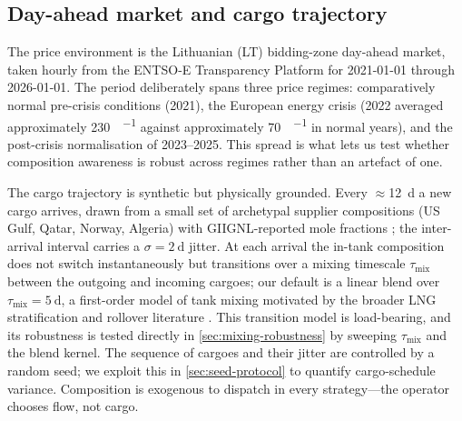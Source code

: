 \documentclass[11pt]{article}
\begin{document}
\subsection{Day-ahead market and cargo trajectory}

The price environment is the Lithuanian (LT) bidding-zone day-ahead market,
taken hourly from the ENTSO-E Transparency Platform \citep{entsoe2023} for
2021-01-01 through 2026-01-01. The period deliberately spans three price
regimes: comparatively normal pre-crisis conditions (2021), the
\citeyear{eu2022crisis} European energy crisis (2022 averaged
approximately \SI{230}{\eur\per\MWh} against approximately
\SI{70}{\eur\per\MWh} in normal
years), and the post-crisis normalisation of 2023--2025. This spread is what
lets us test whether composition awareness is robust across regimes rather
than an artefact of one.

The cargo trajectory is synthetic but physically grounded. Every
$\approx$\SI{12}{\day} a new cargo arrives, drawn from a small set of
archetypal supplier compositions (US Gulf, Qatar, Norway, Algeria) with
GIIGNL-reported mole fractions \citep{giignl2023}; the inter-arrival
interval carries a $\sigma=\SI{2}{\day}$ jitter. At each arrival the in-tank
composition does not switch instantaneously but transitions over a mixing
timescale $\tau_{\text{mix}}$ between the outgoing and incoming cargoes; our
default is a linear blend over $\tau_{\text{mix}}=\SI{5}{\day}$, a first-order
model of tank mixing motivated by the broader LNG stratification and rollover
literature \citep{huang2022lng_rollover_review}. This transition model is
load-bearing, and its robustness is tested directly in
\cref{sec:mixing-robustness} by sweeping $\tau_{\text{mix}}$ and the blend
kernel. The sequence of cargoes and their jitter
are controlled by a random seed; we exploit this in \cref{sec:seed-protocol}
to quantify cargo-schedule variance. Composition is exogenous to dispatch in
every strategy---the operator chooses flow, not cargo.
\end{document}
